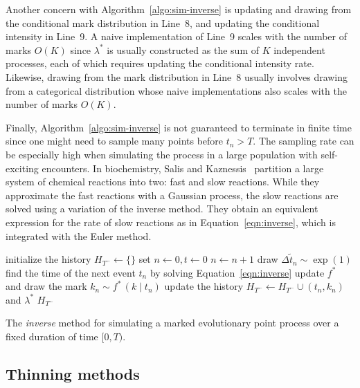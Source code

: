 \documentclass{juliacon}
\begin{document}
Another concern with Algorithm~\ref{algo:sim-inverse} is updating and drawing from the conditional mark distribution in Line~8, and updating the conditional intensity in Line~9. A naive implementation of Line~9 scales with the number of marks \( O(K) \) since \( \lambda^\ast \) is usually constructed as the sum of \( K \) independent processes, each of which requires updating the conditional intensity rate. Likewise, drawing from the mark distribution in Line~8 usually involves drawing from a categorical distribution whose naive implementations also scales with the number of marks \( O(K) \).

Finally, Algorithm~\ref{algo:sim-inverse} is not guaranteed to terminate in finite time since one might need to sample many points before \( t_n > T \). The sampling rate can be especially high when simulating the process in a large population with self-exciting encounters. In biochemistry, Salis and Kaznessis~\cite{salis2005} partition a large system of chemical reactions into two: fast and slow reactions. While they approximate the fast reactions with a Gaussian process, the slow reactions are solved using a variation of the inverse method. They obtain an equivalent expression for the rate of slow reactions as in Equation~\ref{eqn:inverse}, which is integrated with the Euler method.

\begin{algorithm}[h]
\begin{algorithmic}[1]
  \Procedure{InverseMethod}{\( [0, T) \), \( \lambda^\ast \), \( f^\ast \),}
    \State initialize the history \( H_{T^-} \leftarrow \{ \} \)
    \State set \( n \leftarrow 0, t \leftarrow  0 \)
      \State \( n \leftarrow n + 1 \)
      \State draw \( \Delta \tilde{t}_n \sim \exp(1) \)
      \State find the time of the next event \( t_n \) by solving Equation~\ref{eqn:inverse}
      \State update \( f^\ast \) and draw the mark \( k_n \sim f^\ast \, (k \mid t_n) \)
      \State update the history \( H_{T^-} \leftarrow H_{T^-} \cup (t_n, k_n) \) and \( \lambda^\ast \)
    \EndWhile
    \State \Return \( H_{T^-} \)
  \EndProcedure
\end{algorithmic}
\caption{The \textit{inverse} method for simulating a marked evolutionary point process over a fixed duration of time \( [0, T) \).}
\label{algo:sim-inverse}
\end{algorithm}

\subsection{Thinning methods} \label{subsec:sim-thinning}
\end{document}
